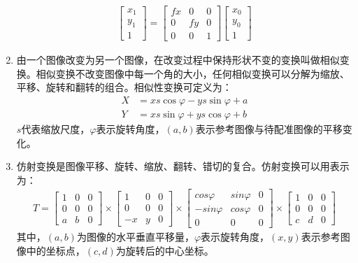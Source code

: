 \begin{enumerate}
\begin{align}
\left[ \begin{array}{c}
x_1 \\
y_1 \\
1   
\end{array} \right]
=
\left[ \begin{array}{ccc}
fx & 0 & 0 \\
0 & fy & 0 \\
0 & 0 & 1
\end{array} \right]
\left[ \begin{array}{c}
x_0 \\
y_0 \\
1
\end{array} \right]
\end{align}
\item 由一个图像改变为另一个图像，在改变过程中保持形状不变的变换叫做相似变换。相似变换不改变图像中每一个角的大小，任何相似变换可以分解为缩放、平移、旋转和翻转的组合。相似性变换可定义为：
\begin{align}
X&=xs\cos\varphi-ys\sin\varphi+a\\
Y&=xs\sin\varphi+ys\cos\varphi+b
\end{align}
$s$代表缩放尺度，$\varphi$表示旋转角度，$(a, b)$表示参考图像与待配准图像的平移变化。
\item 仿射变换是图像平移、旋转、缩放、翻转、错切的复合。仿射变换可以用表示为：
\begin{align}
T = \left[ \begin{array}{ccc}
1 & 0 & 0 \\
0 & 0 & 0 \\
a & b & 0
\end{array} \right]
\times
\left[ \begin{array}{ccc}
1 & 0 & 0 \\
0 & 0 & 0 \\
-x & y & 0
\end{array} \right]
\times
\left[ \begin{array}{ccc}
cos\varphi & sin\varphi & 0 \\
-sin\varphi & cos\varphi & 0 \\
0 & 0 & 0
\end{array} \right]
\times
\left[ \begin{array}{ccc}
1 & 0 & 0 \\
0 & 0 & 0 \\
c & d & 0
\end{array} \right]
\label{eq:affine}
\end{align}
其中，$(a, b)$为图像的水平垂直平移量，$\varphi$表示旋转角度，$(x, y)$表示参考图像中的坐标点，$(c, d)$为旋转后的中心坐标。


\end{enumerate}
